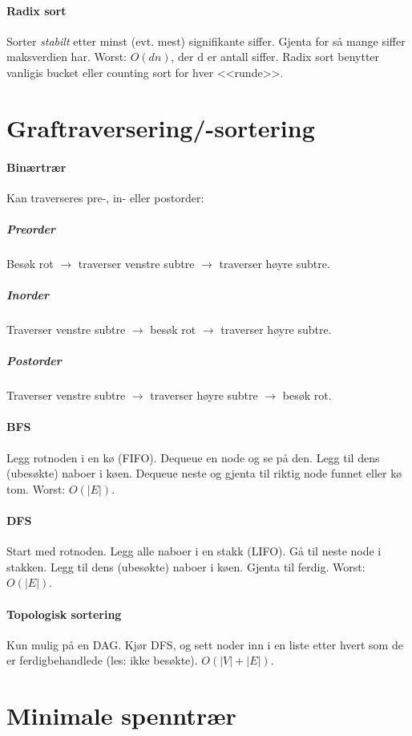 \documentclass[a4paper]{article}
\begin{document}
\paragraph{Radix sort} Sorter \emph{stabilt} etter minst (evt. mest) signifikante siffer. Gjenta for så mange siffer maksverdien har. Worst: $O(dn)$, der d er antall siffer. Radix sort benytter vanligis bucket eller counting sort for hver <<runde>>.



\section{Graftraversering/-sortering}
\paragraph{Binærtrær} Kan traverseres pre-, in- eller postorder:
\subparagraph{Preorder} Besøk rot $\rightarrow$ traverser venstre subtre $\rightarrow$ traverser høyre subtre.
\subparagraph{Inorder} Traverser venstre subtre $\rightarrow$ besøk rot $\rightarrow$ traverser høyre subtre.
\subparagraph{Postorder} Traverser venstre subtre $\rightarrow$ traverser høyre subtre $\rightarrow$ besøk rot.
\paragraph{BFS} Legg rotnoden i en kø (FIFO). Dequeue en node og se på den. Legg til dens (ubesøkte) naboer i køen. Dequeue neste og gjenta til riktig node funnet eller kø tom. Worst: $O(|E|)$.
\paragraph{DFS} Start med rotnoden. Legg alle naboer i en stakk (LIFO). Gå til neste node i stakken. Legg til dens (ubesøkte) naboer i køen. Gjenta til ferdig. Worst: $O(|E|)$.
\paragraph{Topologisk sortering} Kun mulig på en DAG. Kjør DFS, og sett noder inn i en liste etter hvert som de er ferdigbehandlede (les: ikke besøkte). $O(|V|+|E|)$.



\section{Minimale spenntrær}
\end{document}
